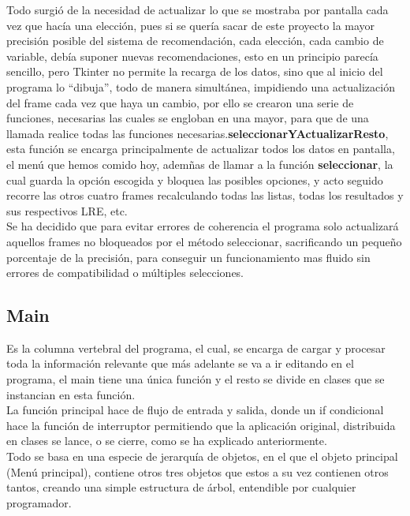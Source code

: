Todo surgió de la necesidad de actualizar lo que se mostraba por pantalla cada vez que hacía una elección, pues si se quería sacar de este proyecto la mayor precisión posible del sistema de recomendación, cada elección, cada cambio de variable, debía suponer nuevas recomendaciones, esto en un principio parecía sencillo, pero Tkinter no permite la recarga de los datos, sino que al inicio del programa lo “dibuja”, todo de manera simultánea, impidiendo una actualización del frame cada vez que haya un cambio, por ello se crearon una serie de funciones, necesarias las cuales se engloban en una mayor, para que de una llamada realice todas las funciones necesarias.\textbf{seleccionarYActualizarResto}, esta función se encarga principalmente de actualizar todos los datos en pantalla, el menú que hemos comido hoy, ademñas de llamar a la función  \textbf{seleccionar}, la cual guarda la opción escogida y bloquea las posibles opciones, y acto seguido recorre las otros cuatro frames recalculando todas las listas, todas los resultados y sus respectivos LRE, etc. \\

Se ha decidido que para evitar errores de coherencia el programa solo actualizará aquellos frames no bloqueados por el método seleccionar, sacrificando un pequeño porcentaje de la precisión, para conseguir un funcionamiento mas fluido sin errores de compatibilidad o múltiples selecciones.\\
\subsection{Main}
Es la columna vertebral del programa, el cual, se encarga de cargar y procesar toda la información relevante que más adelante se va a ir editando en el programa, el main tiene una única función y el resto se divide en clases que se instancian en esta función.\\

La función principal hace de flujo de entrada y salida, donde un if condicional hace la función de interruptor permitiendo que la aplicación original, distribuida en clases se lance, o se cierre, como se ha explicado anteriormente.\\

Todo se basa en una especie de jerarquía de objetos, en el que el objeto principal (Menú principal), contiene otros tres objetos que estos a su vez contienen otros tantos, creando una simple estructura de árbol, entendible por cualquier programador. \\

